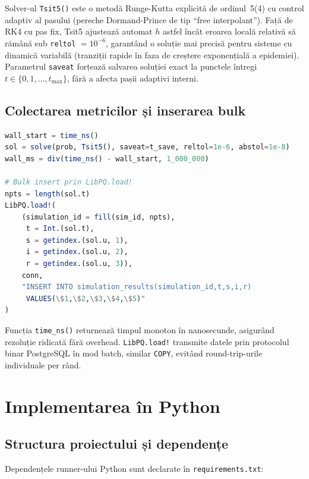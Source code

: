 Solver-ul \texttt{Tsit5()} \cite{tsitouras2011runge} este o metodă
Runge-Kutta explicită de ordinul~5(4) cu control adaptiv al pasului
(pereche Dormand-Prince de tip ``free interpolant''). Față de RK4 cu pas
fix, Tsit5 ajustează automat $h$ astfel încât eroarea locală relativă să
rămână sub \texttt{reltol} $= 10^{-6}$, garantând o soluție mai precisă
pentru sisteme cu dinamică variabilă (tranziții rapide în faza de creștere
exponențială a epidemiei). Parametrul \texttt{saveat} forțează salvarea
soluției exact la punctele întregi $t \in \{0,1,\ldots,t_{\max}\}$, fără
a afecta pașii adaptivi interni.

\subsection{Colectarea metricilor și inserarea bulk}
\label{subsec:julia_stocare}

\begin{lstlisting}[language=Julia, caption={Benchmarking și inserare bulk în Julia.}]
wall_start = time_ns()
sol = solve(prob, Tsit5(), saveat=t_save, reltol=1e-6, abstol=1e-8)
wall_ms = div(time_ns() - wall_start, 1_000_000)

# Bulk insert prin LibPQ.load!
npts = length(sol.t)
LibPQ.load!(
    (simulation_id = fill(sim_id, npts),
     t = Int.(sol.t),
     s = getindex.(sol.u, 1),
     i = getindex.(sol.u, 2),
     r = getindex.(sol.u, 3)),
    conn,
    "INSERT INTO simulation_results(simulation_id,t,s,i,r)
     VALUES(\$1,\$2,\$3,\$4,\$5)"
)
\end{lstlisting}

Funcția \texttt{time\_ns()} returnează timpul monoton în nanosecunde,
asigurând rezoluție ridicată fără overhead. \texttt{LibPQ.load!} transmite
datele prin protocolul binar PostgreSQL în mod batch, similar \texttt{COPY},
evitând round-trip-urile individuale per rând.

\section{Implementarea în Python}
\label{sec:implementare_python}

\subsection{Structura proiectului și dependențe}
\label{subsec:python_structura}

Dependențele runner-ului Python sunt declarate în \texttt{requirements.txt}:

